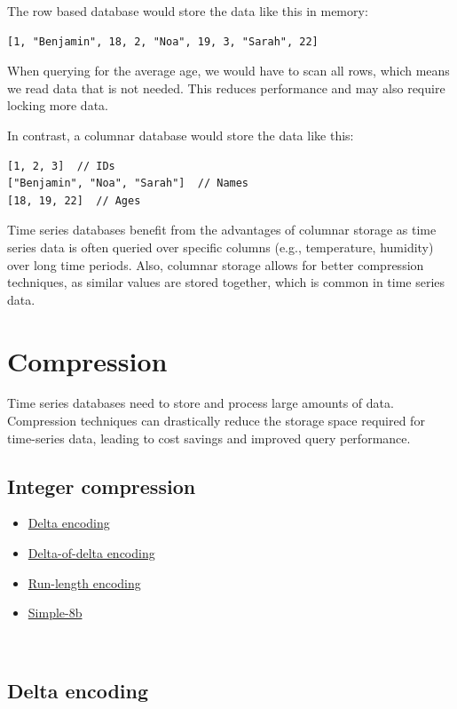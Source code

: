 The row based database would store the data like this in memory:
\begin{verbatim}
[1, "Benjamin", 18, 2, "Noa", 19, 3, "Sarah", 22]
\end{verbatim}

When querying for the average age, we would have to scan all rows, which means
we read data that is not needed. This reduces performance and may also require
locking more data.

In contrast, a columnar database would store the data like this:
\begin{verbatim}
[1, 2, 3]  // IDs
["Benjamin", "Noa", "Sarah"]  // Names
[18, 19, 22]  // Ages
\end{verbatim}

Time series databases benefit from the advantages of columnar storage as time
series data is often queried over specific columns (e.g., temperature,
humidity) over long time periods. Also, columnar storage allows for better
compression techniques, as similar values are stored together, which is common
in time series data.

\section{Compression}\label{sec:compression}

Time series databases need to store and process large amounts of data.
Compression techniques can drastically reduce the storage space required for
time-series data, leading to cost savings and improved query performance.

\subsection{Integer compression}

\begin{itemize}
  \item \hyperref[sec:delta-encoding]{Delta encoding}
  \item \hyperref[sec:delta-of-delta]{Delta-of-delta encoding}
  \item \hyperref[sec:run-length-encoding]{Run-length encoding}
  \item \hyperref[sec:simple-8b]{Simple-8b}
\end{itemize}

~\cite{Compression:01}

\subsection{Delta encoding}\label{sec:delta-encoding}

